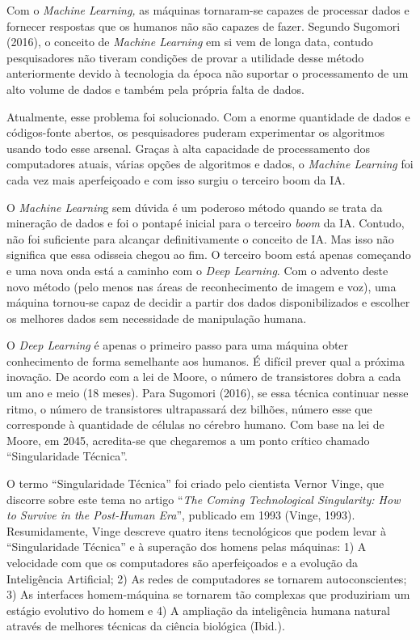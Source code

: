 Com o \emph{Machine Learning,} as máquinas tornaram-se capazes de
processar dados e fornecer respostas que os humanos não são capazes de
fazer. Segundo Sugomori (2016), o conceito de \emph{Machine Learning} em
si vem de longa data, contudo pesquisadores não tiveram condições de
provar a utilidade desse método anteriormente devido à tecnologia da
época não suportar o processamento de um alto volume de dados e também
pela própria falta de dados.

Atualmente, esse problema foi solucionado. Com a enorme quantidade de
dados e códigos-fonte abertos, os pesquisadores puderam experimentar os
algoritmos usando todo esse arsenal. Graças à alta capacidade de
processamento dos computadores atuais, várias opções de algoritmos e
dados, o \emph{Machine Learning} foi cada vez mais aperfeiçoado e com
isso surgiu o terceiro boom da IA.

O \emph{Machine Learnin}g sem dúvida é um poderoso método quando se
trata da mineração de dados e foi o pontapé inicial para o terceiro
\emph{boom} da IA. Contudo, não foi suficiente para alcançar
definitivamente o conceito de IA. Mas isso não significa que essa
odisseia chegou ao fim. O terceiro boom está apenas começando e uma nova
onda está a caminho com o \emph{Deep Learning}. Com o advento deste novo
método (pelo menos nas áreas de reconhecimento de imagem e voz), uma
máquina tornou-se capaz de decidir a partir dos dados disponibilizados e
escolher os melhores dados sem necessidade de manipulação humana.

O \emph{Deep Learning} é apenas o primeiro passo para uma máquina obter
conhecimento de forma semelhante aos humanos. É difícil prever qual a
próxima inovação. De acordo com a lei de Moore, o número de transistores
dobra a cada um ano e meio (18 meses). Para Sugomori (2016), se essa
técnica continuar nesse ritmo, o número de transistores ultrapassará dez
bilhões, número esse que corresponde à quantidade de células no cérebro
humano. Com base na lei de Moore, em 2045, acredita-se que chegaremos a
um ponto crítico chamado ``Singularidade Técnica''.

O termo ``Singularidade Técnica'' foi criado pelo cientista Vernor
Vinge, que discorre sobre este tema no artigo ``\emph{The Coming
Technological Singularity: How to Survive in the Post-Human Era}'',
publicado em 1993 (Vinge, 1993). Resumidamente, Vinge descreve quatro
itens tecnológicos que podem levar à ``Singularidade Técnica'' e à
superação dos homens pelas máquinas: 1) A velocidade com que os
computadores são aperfeiçoados e a evolução da Inteligência Artificial;
2) As redes de computadores se tornarem autoconscientes; 3) As
interfaces homem-máquina se tornarem tão complexas que produziriam um
estágio evolutivo do homem e 4) A ampliação da inteligência humana
natural através de melhores técnicas da ciência biológica (Ibid.).

